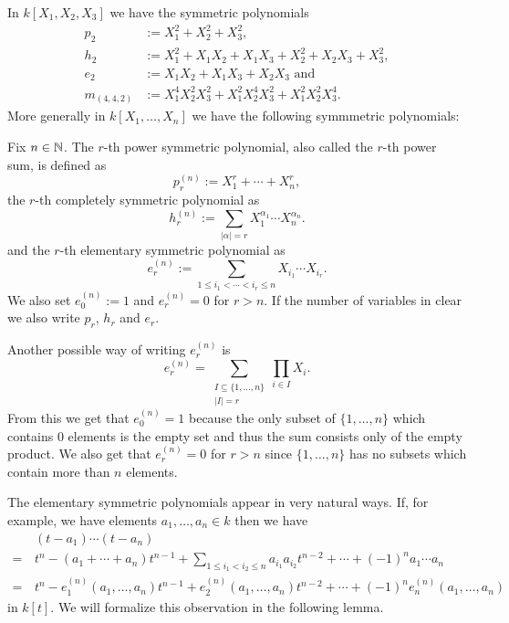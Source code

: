 \begin{expl}
 In $k[X_1, X_2, X_3]$ we have the symmetric polynomials
 \begin{align*}
  p_2 &:= X_1^2 + X_2^2 + X_3^2, \\
  h_2 &:= X_1^2 + X_1 X_2 + X_1 X_3 + X_2^2 + X_2 X_3 + X_3^2, \\
  e_2 &:= X_1 X_2 + X_1 X_3 + X_2 X_3 \text{ and} \\
  m_{(4,4,2)} &:= X_1^4 X_2^2 X_3^2 + X_1^2 X_2^4 X_3^2 + X_1^2 X_2^2 X_3^4.
 \end{align*}
 More generally in $k[X_1, \dotsc, X_n]$ we have the following symmmetric polynomials:
\end{expl}


\begin{defi}
 Fix $n \in \mathbb{N}$. The $r$-th power symmetric polynomial, also called the $r$-th power sum, is defined as
 \[
  p_r^{(n)} := X_1^r + \dotsb + X_n^r,
 \]
 the $r$-th completely symmetric polynomial as
 \[
  h_r^{(n)} := \sum_{|\alpha|=r} X_1^{\alpha_1} \dotsm X_n^{\alpha_n}.
 \]
 and the $r$-th elementary symmetric polynomial as
 \[
  e_r^{(n)} := \sum_{1 \leq i_1 < \dotsb < i_r \leq n} X_{i_1} \dotsm X_{i_r}.
 \]
 We also set $e_0^{(n)} := 1$ and $e_r^{(n)} = 0$ for $r > n$. If the number of variables in clear we also write $p_r$, $h_r$ and $e_r$.
\end{defi}

Another possible way of writing $e^{(n)}_r$ is
\[
 e^{(n)}_r = \sum_{\substack{I \subseteq \{1, \dotsc, n\} \\ |I| = r}} \prod_{i \in I} X_i.
\]
From this we get that $e^{(n)}_0 = 1$ because the only subset of $\{1, \dotsc, n\}$ which contains $0$ elements is the empty set and thus the sum consists only of the empty product. We also get that $e^{(n)}_r = 0$ for $r > n$ since $\{1, \dotsc, n\}$ has no subsets which contain more than $n$ elements.

The elementary symmetric polynomials appear in very natural ways. If, for example, we have elements $a_1, \dotsc, a_n \in k$ then we have
\begin{align*}
  &\, (t-a_1) \dotsm (t-a_n) \\
 =&\, t^n - (a_1 + \dotsb + a_n) t^{n-1} + \sum_{1 \leq i_1 < i_2 \leq n} a_{i_1} a_{i_2} t^{n-2} + \dotsb + (-1)^n a_1 \dotsm a_n \\ 
 =&\, t^n - e^{(n)}_1(a_1, \dotsc, a_n) t^{n-1} + e^{(n)}_2(a_1, \dotsc, a_n) t^{n-2} + \dotsb + (-1)^n e^{(n)}_n(a_1, \dotsc, a_n)
\end{align*}
in $k[t]$. We will formalize this observation in the following lemma.


